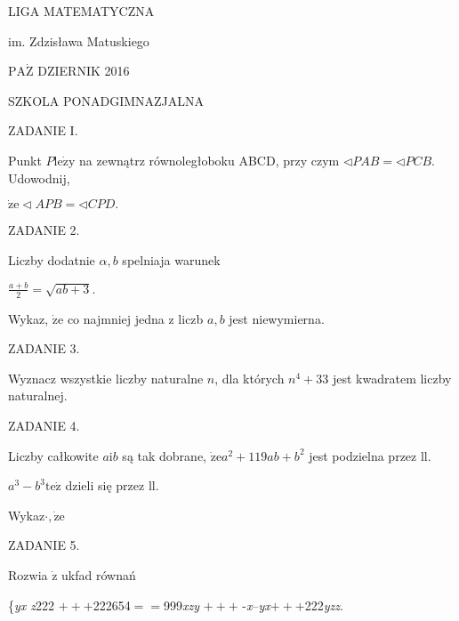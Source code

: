 \documentclass[a4paper,12pt]{article}
\begin{document}
LIGA MATEMATYCZNA

im. Zdzisława Matuskiego

$\mathrm{P}\mathrm{A}\dot{\mathrm{Z}}$ DZIERNIK 2016

SZKOLA PONADGIMNAZJALNA

ZADANIE I.

Punkt $P\mathrm{l}\mathrm{e}\dot{\mathrm{z}}\mathrm{y}$ na zewnątrz równoległoboku ABCD, przy czym $\triangleleft PAB=\triangleleft PCB$. Udowodnij,

$\dot{\mathrm{z}}\mathrm{e}\triangleleft APB=\triangleleft CPD.$

ZADANIE 2.

Liczby dodatnie $\alpha, b$ spelniaja warunek

$\displaystyle \frac{a+b}{2}=\sqrt{ab+3}.$

Wykaz, $\dot{\mathrm{z}}\mathrm{e}$ co najmniej jedna z liczb $a, b$ jest niewymierna.

ZADANIE 3.

Wyznacz wszystkie liczby naturalne $n$, dla których $n^{4}+33$ jest kwadratem liczby naturalnej.

ZADANIE 4.

Liczby całkowite $a\mathrm{i}b$ są tak dobrane, $\dot{\mathrm{z}}\mathrm{e}a^{2}+119ab+b^{2}$ jest podzielna przez ll.

$a^{3}-b^{3}\mathrm{t}\mathrm{e}\dot{\mathrm{z}}$ dzieli się przez ll.

Wykaz$\cdot, \dot{\mathrm{z}}\mathrm{e}$

ZADANIE 5.

Rozwia $\dot{\mathrm{z}}$ ukfad równań

\{{\it yx  z}222 $+++$222654$==$999{\it xzy} $+++$ -{\it x}--{\it yx}$+++$222{\it yzz}.
\end{document}
